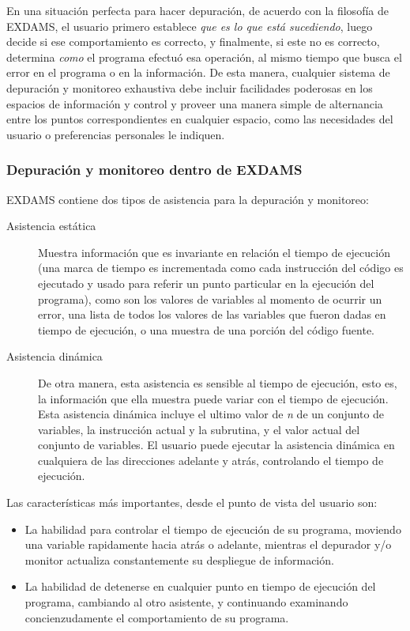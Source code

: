 \documentclass[12pt,legalpaper]{report}
\begin{document}
En una situación perfecta para hacer depuración, de acuerdo con la filosofía de EXDAMS, el usuario primero establece \textit{que es lo que está sucediendo}, luego decide si ese comportamiento es correcto, y finalmente, si este no es correcto, determina \textit{como} el programa efectuó esa operación, al mismo tiempo que busca el error en el programa o en la información.  De esta manera, cualquier sistema de depuración y monitoreo exhaustiva debe incluir facilidades poderosas en los espacios de información y control y proveer una manera simple de alternancia entre los puntos correspondientes en cualquier espacio, como las necesidades del usuario o preferencias personales le indiquen.

			\subsubsection[Depuración y monitoreo]{Depuración y monitoreo dentro de EXDAMS}

EXDAMS contiene dos tipos de asistencia para la depuración y monitoreo:

\begin{description}
	\item[Asistencia estática] Muestra información que es invariante en relación el tiempo de ejecución (una marca de tiempo es incrementada como cada instrucción del código es ejecutado y usado para referir un punto particular en la ejecución del programa), como son los valores de variables al momento de ocurrir un error, una lista de todos los valores de las variables que fueron dadas en tiempo de ejecución, o una muestra de una porción del código fuente.

	\item[Asistencia dinámica] De otra manera, esta asistencia es sensible al tiempo de ejecución, esto es, la información que ella muestra puede variar con el tiempo de ejecución.  Esta asistencia dinámica incluye el ultimo valor de \textit{n} de un conjunto de variables, la instrucción actual y la subrutina, y el valor actual del conjunto de variables.  El usuario puede ejecutar la asistencia dinámica en cualquiera de las direcciones adelante y atrás, controlando el tiempo de ejecución.

\end{description}

Las características más importantes, desde el punto de vista del usuario son:

\begin{itemize}
	\item La habilidad para controlar el tiempo de ejecución de su programa, moviendo una variable rapidamente hacia atrás o adelante, mientras el depurador y/o monitor actualiza constantemente su despliegue de información.

	\item La habilidad de detenerse en cualquier punto en tiempo de ejecución del programa, cambiando al otro asistente, y continuando examinando concienzudamente el comportamiento de su programa.

\end{itemize}
\end{document}
